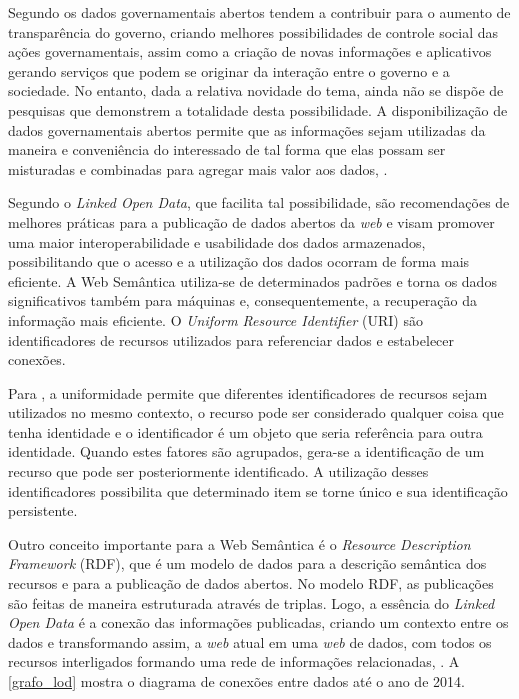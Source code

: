 \documentclass[
	12pt,				%
	openright,			%
	twoside,			%
	a4paper,			%
	english,			%
	french,				%
	spanish,			%
	brazil				%
	]{abntex2}
\begin{document}
Segundo  os dados governamentais abertos tendem a contribuir para o aumento de transparência do 
governo, criando melhores possibilidades de controle social das ações governamentais, assim como a criação de novas informações
e aplicativos gerando serviços que podem se originar da interação entre o governo e a sociedade. No entanto, dada a relativa
novidade do tema, ainda não se dispõe de pesquisas que demonstrem a totalidade desta possibilidade. A  disponibilização  de 
dados  governamentais  abertos permite  que  as  informações sejam  utilizadas  da  maneira  e  conveniência  do  
interessado  de  tal  forma  que  elas possam ser misturadas e combinadas para agregar mais valor aos dados, . 

Segundo  o \emph{Linked Open Data}, que facilita tal possibilidade, são recomendações de melhores 
práticas para a publicação de dados abertos da \emph{web} e visam promover uma maior interoperabilidade e usabilidade dos 
dados armazenados, possibilitando que o acesso e a utilização dos dados ocorram de forma mais eficiente. A Web Semântica 
utiliza-se de determinados padrões e torna os dados significativos também para máquinas e, consequentemente, a recuperação 
da informação mais eficiente. O \emph{Uniform Resource Identifier} (URI) são identificadores de recursos utilizados para 
referenciar dados e estabelecer conexões. 


Para , a uniformidade permite que diferentes identificadores de recursos sejam utilizados no mesmo contexto, o recurso pode ser considerado qualquer coisa que tenha 
identidade e o identificador é um objeto que seria referência para outra identidade. Quando estes fatores são agrupados,
gera-se a identificação de um recurso que pode ser posteriormente identificado.  A utilização desses identificadores 
possibilita que determinado item se torne único e sua identificação persistente. 

Outro conceito importante para a Web Semântica é o \emph{Resource Description Framework} (RDF), que é um modelo de dados para a descrição semântica dos recursos e para a 
publicação de dados abertos. No modelo RDF, as publicações são feitas de maneira estruturada através de triplas. Logo, a 
essência do \emph{Linked Open Data} é a conexão das informações publicadas, criando um contexto entre os dados e transformando 
assim, a \emph{web} atual em uma \emph{web} de dados, com todos os recursos interligados formando uma rede de informações relacionadas,
. A \autoref{grafo_lod} mostra o diagrama de conexões entre dados até o ano de 2014.
\end{document}
